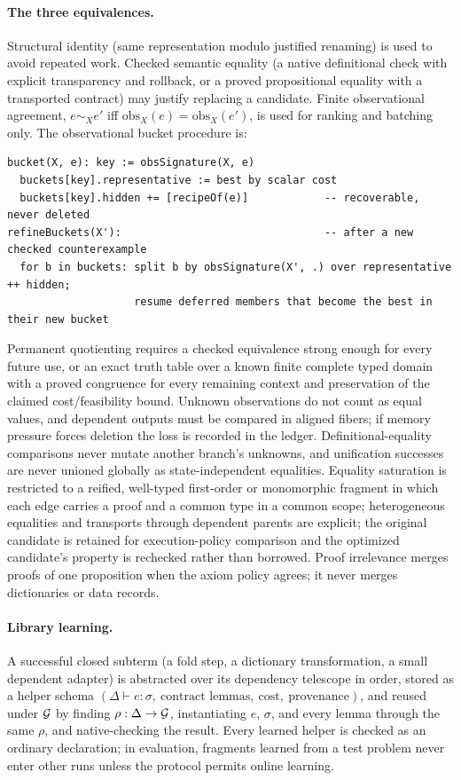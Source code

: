 \paragraph{The three equivalences.} Structural identity (same representation modulo justified renaming) is used to avoid repeated work. Checked semantic equality (a native definitional check with explicit transparency and rollback, or a proved propositional equality with a transported contract) may justify replacing a candidate. Finite observational agreement, $e\sim_X e'$ iff $\mathrm{obs}_X(e)=\mathrm{obs}_X(e')$, is used for ranking and batching only. The observational bucket procedure is:
\begin{lstlisting}
bucket(X, e): key := obsSignature(X, e)
  buckets[key].representative := best by scalar cost
  buckets[key].hidden += [recipeOf(e)]            -- recoverable, never deleted
refineBuckets(X'):                                -- after a new checked counterexample
  for b in buckets: split b by obsSignature(X', .) over representative ++ hidden;
                    resume deferred members that become the best in their new bucket
\end{lstlisting}
Permanent quotienting requires a checked equivalence strong enough for every future use, or an exact truth table over a known finite complete typed domain with a proved congruence for every remaining context and preservation of the claimed cost/feasibility bound. Unknown observations do not count as equal values, and dependent outputs must be compared in aligned fibers; if memory pressure forces deletion the loss is recorded in the ledger. Definitional-equality comparisons never mutate another branch's unknowns, and unification successes are never unioned globally as state-independent equalities. Equality saturation is restricted to a reified, well-typed first-order or monomorphic fragment in which each edge carries a proof and a common type in a common scope; heterogeneous equalities and transports through dependent parents are explicit; the original candidate is retained for execution-policy comparison and the optimized candidate's property is rechecked rather than borrowed. Proof irrelevance merges proofs of one proposition when the axiom policy agrees; it never merges dictionaries or data records.

\paragraph{Library learning.} A successful closed subterm (a fold step, a dictionary transformation, a small dependent adapter) is abstracted over its dependency telescope in order, stored as a helper schema $(\Delta\vdash e:\sigma,\ \text{contract lemmas},\ \text{cost},\ \text{provenance})$, and reused under $\mathcal{G}$ by finding $\rho:\Delta\to\mathcal{G}$, instantiating $e$, $\sigma$, and every lemma through the same $\rho$, and native-checking the result. Every learned helper is checked as an ordinary declaration; in evaluation, fragments learned from a test problem never enter other runs unless the protocol permits online learning.

